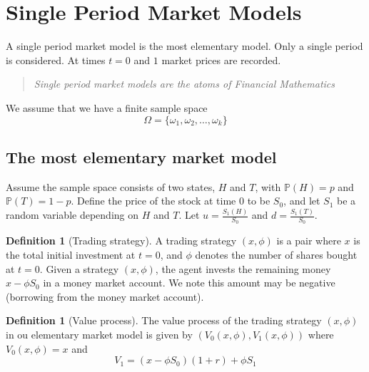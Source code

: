 \documentclass[10pt, oneside, reqno]{amsart}
\theoremstyle{plain}%
\theoremstyle{definition}
\newtheorem{defn}[thm]{Definition}
\theoremstyle{remark}
\newcommand{\prob}[1]{\mathbb{P}(#1)}
\begin{document}


\newcommand{\tst}{(x,\phi)}

\section{Single Period Market Models} %
\label{sec:single_period_market_models}

A single period market model is the most elementary model.  Only a single period is considered.  At times $t=0$ and $1$ market prices are recorded.

\begin{quote}
\emph{  Single period market models are the atoms of Financial Mathematics
}\end{quote}

We assume that we have a finite sample space \[
    \Omega = \{ \omega_1, \omega_2, \dots, \omega_k \}
\]

\subsection{The most elementary market model} %
\label{sub:the_most_elementary_market_model}

Assume the sample space consists of two states, $H$ and $T$, with $\prob{H} = p$ and $ \prob{T} = 1-p$.  Define the price of the stock at time $0$ to be $S_0$, and let $S_1$ be a random variable depending on $H$ and $T$.  Let $u = \frac{S_1(H)}{S_0}$ and $d = \frac{S_1(T)}{S_0}$.  


\begin{defn}[Trading strategy]
    A trading strategy $(x,\phi)$ is a pair where $x$ is the total initial investment at $t=0$, and $\phi$ denotes the number of shares bought at $t = 0$.  Given a strategy $(x,\phi)$, the agent invests the remaining money $x - \phi S_0$ in a money market account.  We note this amount may be negative (borrowing from the money market account).
\end{defn}

\begin{defn}[Value process]
    The value process of the trading strategy $(x,\phi)$ in ou elementary market model is given by $(V_0(x,\phi), V_1(x,\phi))$ where $V_0(x,\phi) = x$ and \[
        V_1 = (x - \phi S_0)(1+r) +\phi S_1
    \]
\end{defn}
\end{document}

